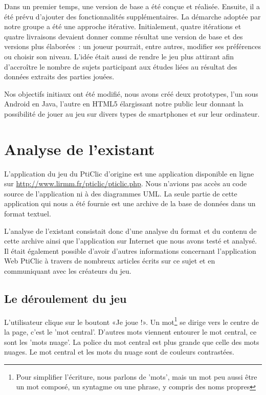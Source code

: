 \documentclass[a4paper,11pt,french]{article}
\begin{document}
Dans un premier temps, une version de base a été conçue et réalisée. Ensuite, il a été prévu d'ajouter des fonctionnalités supplémentaires. La démarche adoptée par notre groupe a été une approche itérative. Initialement, quatre itérations et quatre livraisons devaient donner comme résultat une version de base et des versions plus élaborées~: un joueur pourrait, entre autres, modifier ses préférences ou choisir son niveau. L'idée était aussi de rendre le jeu plus attirant afin d'accroître le nombre de sujets participant aux études liées au résultat des données extraits des parties jouées.

Nos objectifs initiaux ont été modifié, nous avons créé deux prototypes, l'un sous Android en Java, l'autre en HTML5 élargissant notre public leur donnant la possibilité de jouer au jeu sur divers types de smartphones et sur leur ordinateur.


\pagebreak

 
\section{Analyse de l'existant}

L'application du jeu du PtiClic d'origine est une application disponible en ligne sur \url{http://www.lirmm.fr/pticlic/pticlic.php}. Nous
n'avions pas accès au code source de l'application ni à des diagrammes UML. La seule partie de cette application qui nous a été fournie est
une archive de la base de données dans un format textuel.

L'analyse de l'existant consistait donc d'une analyse du format et du contenu de cette archive ainsi que l'application sur Internet que nous avons testé et analysé. Il était également possible d'avoir d'autres informations concernant l'application Web PtiClic à travers de nombreux articles écrits sur ce sujet et en communiquant avec les créateurs du jeu.

\subsection{Le déroulement du jeu}
L'utilisateur clique sur le boutont «Je joue !». Un mot\footnote{Pour simplifier l'écriture, nous parlons de 'mots', mais un mot peu aussi être un mot composé, un syntagme ou une phrase, y compris des noms propres} se dirige vers le centre de la page, c'est le 'mot central'. D'autres mots viennent entourer le mot central, ce sont les 'mots nuage'. La police du mot central est plus grande que celle des mots nuages. Le mot central et les mots du nuage sont de couleurs contrastées.
\end{document}
